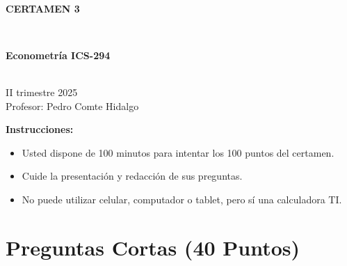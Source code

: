 \documentclass[10pt,a4paper]{article}
\begin{document}
\vspace{5cm}



\begin{center}
\begin{large}
\textbf{\\CERTAMEN 3}
\end{large}\\
\end{center}

\begin{center}
\begin{large}
\textbf{Econometría ICS-294}
\end{large}\\
\vspace{0.2cm}
II trimestre 2025\\
Profesor: Pedro Comte Hidalgo
\end{center}

\textbf{Instrucciones:} 

\begin{itemize}

    \item Usted dispone de 100 minutos  para intentar los 100 puntos del certamen.
    \item Cuide la presentación y redacción de sus preguntas.
    \item No puede utilizar celular, computador o tablet, pero sí una calculadora TI.
     
\end{itemize}

\section{Preguntas Cortas (40 Puntos)}
\end{document}
